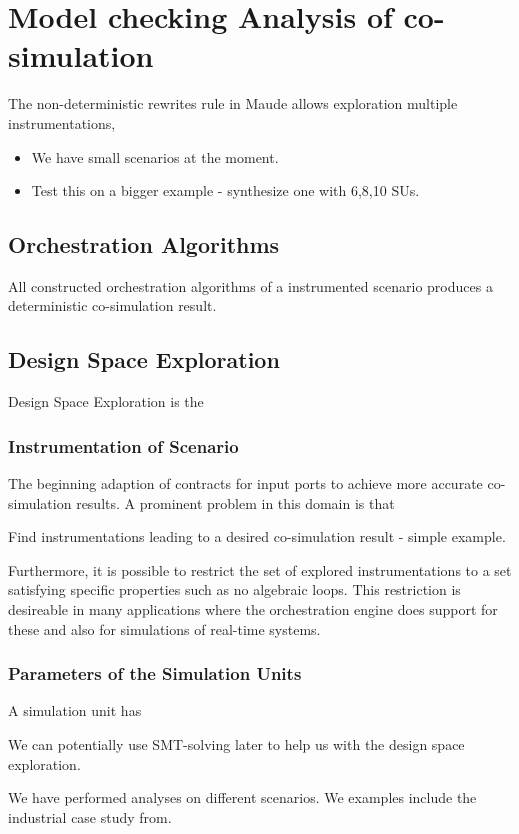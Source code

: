 \section{Model checking Analysis of co-simulation}
The non-deterministic rewrites rule in Maude allows exploration multiple instrumentations, 


\begin{itemize}
    \item We have small scenarios at the moment.
    \item Test this on a bigger example - synthesize one with 6,8,10 SUs.
\end{itemize}


\subsection{Orchestration Algorithms}
All constructed orchestration algorithms of a instrumented scenario produces a deterministic co-simulation result.




\subsection{Design Space Exploration}
Design Space Exploration is the 

\subsubsection{Instrumentation of Scenario}
The beginning adaption of contracts for input ports to achieve more accurate co-simulation results. 
A prominent problem in this domain is that   

Find instrumentations leading to a desired co-simulation result - simple example. 

Furthermore, it is possible to restrict the set of explored instrumentations to a set satisfying specific properties such as no algebraic loops.
This restriction is desireable in many applications where the orchestration engine does support for these and also for simulations of real-time systems.

\subsubsection{Parameters of the Simulation Units}
A simulation unit has 



We can potentially use SMT-solving later to help us with the design space exploration.


We have performed analyses on different scenarios. 
We examples include the industrial case study from. 